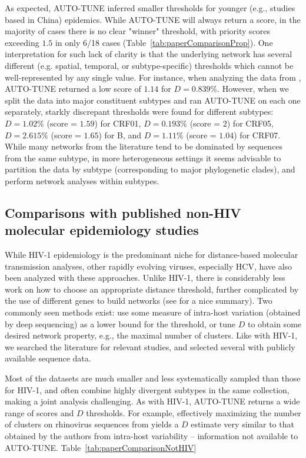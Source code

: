 \documentclass[utf8]{FrontiersinHarvard} %
\begin{document}
As expected, AUTO-TUNE inferred smaller thresholds for younger (e.g., studies
based in China) epidemics. While AUTO-TUNE will always return a score, in the
majority of cases there is no clear "winner" threshold, with priority scores
exceeding $1.5$ in only 6/18 cases (Table~\ref{tab:paperComparisonProp}). One
interpretation for such lack of clarity is that the underlying network has
several different (e.g. spatial, temporal, or subtype-specific) thresholds
which cannot be well-represented by any single value. For instance, when
analyzing the data from \citet{Yan:2021aa}, AUTO-TUNE returned a low score of
$1.14$ for $D=0.839\%$. However, when we split the data into major constituent
subtypes and ran AUTO-TUNE on each one separately, starkly discrepant
thresholds were found for different subtypes: $D=1.02\%$ (score = $1.59$) for
CRF01, $D=0.193\%$ (score = $2$) for CRF05, $D=2.615\%$ (score = $1.65$) for B,
and $D=1.11\%$ (score = $1.04$) for CRF07. While many networks from the
literature tend to be dominated by sequences from the same subtype, in more
heterogeneous settings it seems advisable to partition the data by subtype
(corresponding to major phylogenetic clades), and perform network analyses
within subtypes.

\subsection{Comparisons with published non-HIV molecular epidemiology studies}

While HIV-1 epidemiology is the predominant niche for distance-based molecular
transmission analyses, other rapidly evolving viruses, especially HCV, have
also been analyzed with these approaches. Unlike HIV-1, there is considerably
less work on how to choose an appropriate distance threshold, further
complicated by the use of different genes to build networks (see
\citet{Chan:2020aa} for a nice summary). Two commonly seen methods exist: use
some measure of intra-host variation (obtained by deep sequencing) as a lower
bound for the threshold, or tune $D$ to obtain some desired network property,
e.g., the maximal number of clusters. Like with HIV-1, we searched the
literature for relevant studies, and selected several with publicly available
sequence data.

Most of the datasets are much smaller and less systematically sampled than
those for HIV-1, and often combine highly divergent subtypes in the same
collection, making a joint analysis challenging. As with HIV-1, AUTO-TUNE
returns a wide range of scores and $D$ thresholds. For example, effectively
maximizing the number of clusters on rhinovirus sequences from
\citet{Ng:2022aa} yields a $D$ estimate very similar to that obtained by the
authors from intra-host variability -- information not available to AUTO-TUNE.
Table~\ref{tab:paperComparisonNotHIV}
\end{document}
